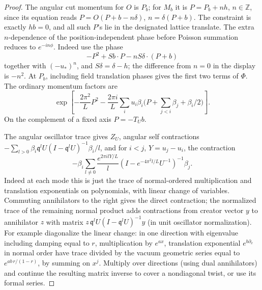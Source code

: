 \begin{proof}
The angular cut momentum for \(O\) is \(P_b\); for \(M_b\) it is \(P=P_b+n h\), \(n\in\mathbb Z\), since its equation reads \(P=O(P+b-n\delta)\), \(n=\delta(P+b)\). The constraint is exactly \(hb=0\), and all such \(P\)'s lie in the designated lattice translate. The extra \(n\)-dependence of the position-independent phase before Poisson summation reduces to \(e^{-i n\phi}\). Indeed use the phase
\[
 -P^2+Sb\cdot P-n S\delta\cdot(P+b)
\]
together with \((-u_*)^n\), and \(S\delta=\delta-h\); the difference from \(n=0\) in the display is \(-n^2\). At \(P_b\), including field translation phases gives the first two terms of \(\Phi\). The ordinary momentum factors are
\[
 \exp\left[-\frac{2\pi^2}L P^2-\frac{2\pi i}{L}
       \sum_i u_i\beta_i\Big(P+\sum_{j<i}\beta_j+\beta_i/2\Big)\right].
\]
On the complement of a fixed axis \(P=-T_U b\).

The angular oscillator trace gives \(Z_U\), angular self contractions
\(-\sum_{l>0}\beta_i \mathfrak q^l U(I-\mathfrak q^l U)^{-1}\beta_i/l\), and for \(i<j\), \(Y=u_j-u_i\), the contraction
\[
 -\beta_i\sum_{l\ne0}\frac{e^{2\pi i lY/L}}l
       (I-e^{-4\pi^2 l/L} U^{-1})^{-1}\beta_j.
\]
Indeed at each mode this is just the trace of normal-ordered multiplication and translation exponentials on polynomials, with linear change of variables. Commuting annihilators to the right gives the direct contraction; the normalized trace of the remaining normal product adds contractions from creator vector \(y\) to annihilator \(z\) with matrix \(z\,\mathfrak q^l U(I-\mathfrak q^l U)^{-1} y\) (in unit oscillator normalization). For example diagonalize the linear change: in one direction with eigenvalue including damping equal to \(r\), multiplication by \(e^{a x}\), translation exponential \(e^{b\partial_x}\) in normal order have trace divided by the vacuum geometric series equal to \(e^{ab\,r/(1-r)}\), by summing on \(x^j\). Multiply over directions (using dual annihilators) and continue the resulting matrix inverse to cover a nondiagonal twist, or use its formal series.


\end{proof}
